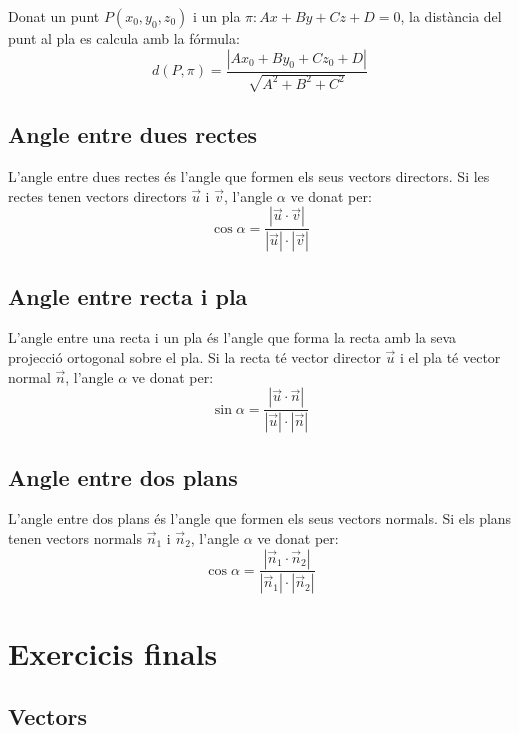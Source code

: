 \documentclass[12pt]{article}
\begin{document}
\begin{concept}
Donat un punt $P(x_0, y_0, z_0)$ i un pla $\pi: Ax + By + Cz + D = 0$, la distància del punt al pla es calcula amb la fórmula:
\[
\boxed{d(P,\pi) = \frac{|Ax_0 + By_0 + Cz_0 + D|}{\sqrt{A^2 + B^2 + C^2}}}
\]
\end{concept}

\subsection{Angle entre dues rectes}

\begin{concept}
L'angle entre dues rectes és l'angle que formen els seus vectors directors. Si les rectes tenen vectors directors $\vec{u}$ i $\vec{v}$, l'angle $\alpha$ ve donat per:
\[
\cos \alpha = \frac{|\vec{u} \cdot \vec{v}|}{|\vec{u}| \cdot |\vec{v}|}
\]
\end{concept}

\subsection{Angle entre recta i pla}

\begin{concept}
L'angle entre una recta i un pla és l'angle que forma la recta amb la seva projecció ortogonal sobre el pla. Si la recta té vector director $\vec{u}$ i el pla té vector normal $\vec{n}$, l'angle $\alpha$ ve donat per:
\[
\sin \alpha = \frac{|\vec{u} \cdot \vec{n}|}{|\vec{u}| \cdot |\vec{n}|}
\]
\end{concept}

\subsection{Angle entre dos plans}

\begin{concept}
L'angle entre dos plans és l'angle que formen els seus vectors normals. Si els plans tenen vectors normals $\vec{n}_1$ i $\vec{n}_2$, l'angle $\alpha$ ve donat per:
\[
\cos \alpha = \frac{|\vec{n}_1 \cdot \vec{n}_2|}{|\vec{n}_1| \cdot |\vec{n}_2|}
\]
\end{concept}

\section{Exercicis finals}

\subsection{Vectors}
\end{document}
